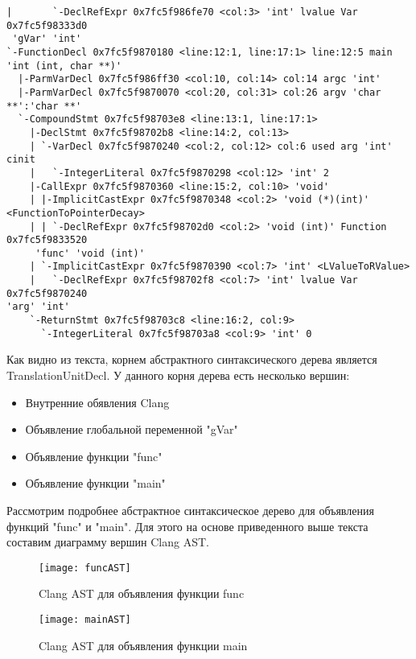\begin{lstlisting}[basicstyle=\tiny]
|       `-DeclRefExpr 0x7fc5f986fe70 <col:3> 'int' lvalue Var 0x7fc5f98333d0
 'gVar' 'int'
`-FunctionDecl 0x7fc5f9870180 <line:12:1, line:17:1> line:12:5 main 'int (int, char **)'
  |-ParmVarDecl 0x7fc5f986ff30 <col:10, col:14> col:14 argc 'int'
  |-ParmVarDecl 0x7fc5f9870070 <col:20, col:31> col:26 argv 'char **':'char **'
  `-CompoundStmt 0x7fc5f98703e8 <line:13:1, line:17:1>
    |-DeclStmt 0x7fc5f98702b8 <line:14:2, col:13>
    | `-VarDecl 0x7fc5f9870240 <col:2, col:12> col:6 used arg 'int' cinit
    |   `-IntegerLiteral 0x7fc5f9870298 <col:12> 'int' 2
    |-CallExpr 0x7fc5f9870360 <line:15:2, col:10> 'void'
    | |-ImplicitCastExpr 0x7fc5f9870348 <col:2> 'void (*)(int)' <FunctionToPointerDecay>
    | | `-DeclRefExpr 0x7fc5f98702d0 <col:2> 'void (int)' Function 0x7fc5f9833520
     'func' 'void (int)'
    | `-ImplicitCastExpr 0x7fc5f9870390 <col:7> 'int' <LValueToRValue>
    |   `-DeclRefExpr 0x7fc5f98702f8 <col:7> 'int' lvalue Var 0x7fc5f9870240
'arg' 'int'
    `-ReturnStmt 0x7fc5f98703c8 <line:16:2, col:9>
      `-IntegerLiteral 0x7fc5f98703a8 <col:9> 'int' 0
\end{lstlisting}

Как видно из текста, корнем абстрактного синтаксического дерева является TranslationUnitDecl.
У данного корня дерева есть несколько вершин:
\begin{itemize}
 \item Внутренние обявления Clang
 \item Объявление глобальной переменной "gVar"
 \item Объявление функции "func"
 \item Объявление функции "main"
\end{itemize}

Рассмотрим подробнее абстрактное синтаксическое дерево для объявления функций "func" и "main". Для этого
на основе приведенного выше текста составим диаграмму вершин Clang AST.
\begin{figure}[H]
\centering
\texttt{[image: funcAST]}
\caption{Clang AST для объявления функции func}%
\label{fig:funcAST}
\end{figure}
\begin{figure}[H]
\centering
\texttt{[image: mainAST]}
\caption{Clang AST для объявления функции main}%
\label{fig:mainAST}
\end{figure}

